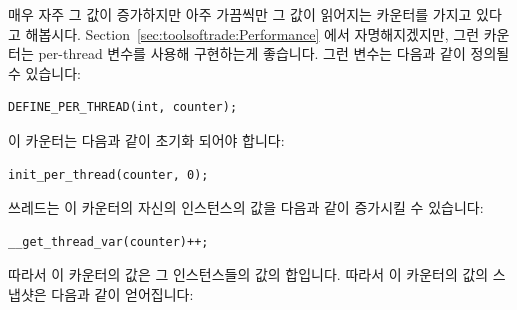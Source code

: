 매우 자주 그 값이 증가하지만 아주 가끔씩만 그 값이 읽어지는 카운터를 가지고
있다고 해봅시다.
Section~\ref{sec:toolsoftrade:Performance} 에서 자명해지겠지만, 그런 카운터는
per-thread 변수를 사용해 구현하는게 좋습니다.
그런 변수는 다음과 같이 정의될 수 있습니다:

\vspace{5pt}
\begin{minipage}[t]{\columnwidth}
\small
\begin{verbatim}
DEFINE_PER_THREAD(int, counter);
\end{verbatim}
\end{minipage}
\vspace{5pt}

이 카운터는 다음과 같이 초기화 되어야 합니다:

\vspace{5pt}
\begin{minipage}[t]{\columnwidth}
\small
\begin{verbatim}
init_per_thread(counter, 0);
\end{verbatim}
\end{minipage}
\vspace{5pt}

쓰레드는 이 카운터의 자신의 인스턴스의 값을 다음과 같이 증가시킬 수 있습니다:

\vspace{5pt}
\begin{minipage}[t]{\columnwidth}
\small
\begin{verbatim}
__get_thread_var(counter)++;
\end{verbatim}
\end{minipage}
\vspace{5pt}

따라서 이 카운터의 값은 그 인스턴스들의 값의 합입니다.
따라서 이 카운터의 값의 스냅샷은 다음과 같이 얻어집니다:

